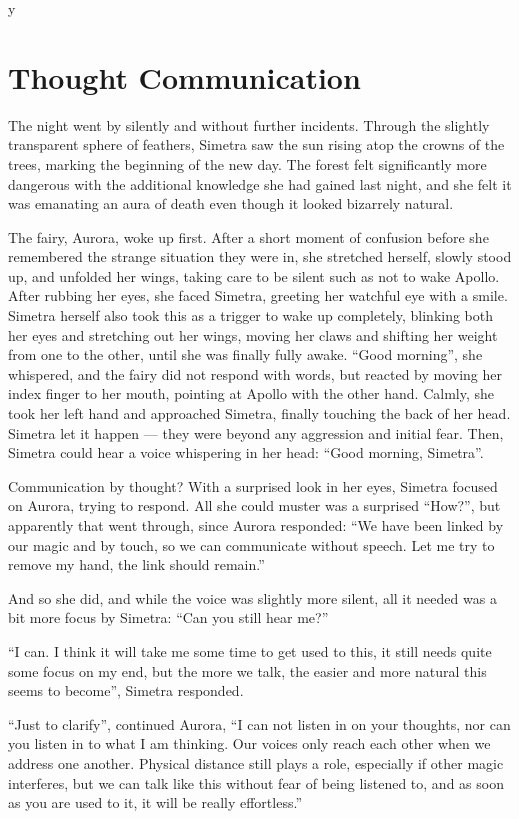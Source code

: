 y\chapter{Thought Communication}
\label{cha:thought-communication}
The night went by silently and without further incidents. Through the slightly transparent sphere of feathers, Simetra saw the sun rising atop the crowns of the trees, marking the beginning of the new day. The forest felt significantly more dangerous with the additional knowledge she had gained last night, and she felt it was emanating an aura of death even though it looked bizarrely natural.

The fairy, Aurora, woke up first. After a short moment of confusion before she remembered the strange situation they were in, she stretched herself, slowly stood up, and unfolded her wings, taking care to be silent such as not to wake Apollo. After rubbing her eyes, she faced Simetra, greeting her watchful eye with a smile. Simetra herself also took this as a trigger to wake up completely, blinking both her eyes and stretching out her wings, moving her claws and shifting her weight from one to the other, until she was finally fully awake. \enquote{Good morning}, she whispered, and the fairy did not respond with words, but reacted by moving her index finger to her mouth, pointing at Apollo with the other hand. Calmly, she took her left hand and approached Simetra, finally touching the back of her head. Simetra let it happen --- they were beyond any aggression and initial fear. Then, Simetra could hear a voice whispering in her head: \enquote{Good morning, Simetra}.

Communication by thought? With a surprised look in her eyes, Simetra focused on Aurora, trying to respond. All she could muster was a surprised \enquote{How?}, but apparently that went through, since Aurora responded: \enquote{We have been linked by our magic and by touch, so we can communicate without speech. Let me try to remove my hand, the link should remain.}

And so she did, and while the voice was slightly more silent, all it needed was a bit more focus by Simetra: \enquote{Can you still hear me?}

\enquote{I can. I think it will take me some time to get used to this, it still needs quite some focus on my end, but the more we talk, the easier and more natural this seems to become}, Simetra responded.

\enquote{Just to clarify}, continued Aurora, \enquote{I can not listen in on your thoughts, nor can you listen in to what I am thinking. Our voices only reach each other when we address one another. Physical distance still plays a role, especially if other magic interferes, but we can talk like this without fear of being listened to, and as soon as you are used to it, it will be really effortless.}

